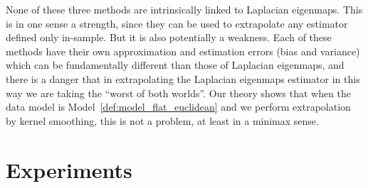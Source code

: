 \documentclass{article}
\newcommand{\Reals}{\mathbb{R}}
\newcommand{\1}{\mathbf{1}}
\newcommand{\mc}[1]{\mathcal{#1}}
\theoremstyle{alden}
\theoremstyle{aldenthm}
\theoremstyle{definition}
\theoremstyle{remark}
\begin{document}
\begin{itemize}
	None of these three methods are intrinsically linked to Laplacian eigenmaps. This is in one sense a strength, since they can be used to extrapolate any estimator defined only in-sample. But it is also potentially a weakness. Each of these methods have their own approximation and estimation errors (bias and variance) which can be fundamentally different than those of Laplacian eigenmaps, and there is a danger that in extrapolating the Laplacian eigenmaps estimator in this way we are taking the ``worst of both worlds''. Our theory shows that when the data model is Model~\ref{def:model_flat_euclidean} and we perform extrapolation by kernel smoothing, this is not a problem, at least in a minimax sense. 
	
\end{itemize}

\section{Experiments}
\label{sec:experiments}
\end{document}
